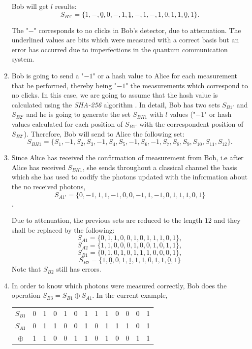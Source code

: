 \begin{enumerate}
      Bob will get $l$ results:
      $$S_{B2'} = \{1,-,\underline{0},0,-,1,\underline{1},-,1,-,1,0,1,1,\underline{0},1 \}.$$

      The "$-$"\space{ } corresponds to no clicks in Bob's detector, due to attenuation. The underlined values are bits which were measured with a correct basis but an error has occurred due to imperfections in the quantum communication system.

  \item Bob is going to send a "$-1$"\space{ } or a hash value to Alice for each measurement that he performed, thereby being "$-1$"\space{ } the measurements which correspond to no clicks. In this case, we are going to assume that the hash value is calculated using the \textit{SHA-256} algorithm \cite{Liu2009}. In detail, Bob has two sets $S_{B1'}$ and $S_{B2'}$ and he is going to generate the set $S_{BH1}$ with $l$ values ("$-1$"\space{ } or hash values calculated for each position of $S_{B1'}$ with the correspondent position of $S_{B2'}$). Therefore, Bob will send to Alice the following set:
      $$S_{BH1}=\{{S}_{1},-1,{S}_{2},{S}_{3}, -1,{S}_{4},{S}_{5},-1,{S}_{6},-1,{S}_{7},{S}_{8},{S}_{9},{S}_{10},{S}_{11},{S}_{12} \}.$$


  \item Since Alice has received the confirmation of measurement from Bob, i.e after Alice has received $S_{BH1}$, she sends throughout a classical channel the basis which she has used to codify the photons updated with the information about the no received photons, $$S_{A1'} = \{0,-1,1,1,-1,0,0,-1,1,-1,0,1,1,1,0,1 \}$$.

      Due to attenuation, the previous sets are reduced to the length $12$ and they shall be replaced by the following:
      $$S_{A1}=\{0,1,1,0,0,1,0,1,1,1,0,1 \},$$
      $$S_{A2}=\{1,1,0,0,0,1,0,0,1,0,1,1 \},$$
      $$S_{B1}=\{0,1,0,1,0,1,1,1,0,0,0,1 \},$$
      $$S_{B2}=\{1,\underline{0},0,1,\underline{1},1,1,0,1,1,\underline{0},1 \}$$
      Note that $S_{B2}$ still has errors.

  \item In order to know which photons were measured correctly, Bob does the operation $S_{B3}=S_{B1} \oplus S_{A1}$.
      In the current example,

  \begin{table}[H]
    \centering
    \begin{tabular}{c|c c c c c c c c c c c c }
     $S_{B1}$ & 0 & 1 & 0 & 1 & 0 & 1 & 1 & 1 & 0 & 0 & 0 & 1\\
     $S_{A1}$ & 0 & 1 & 1 & 0 & 0 & 1 & 0 & 1 & 1 & 1 & 0 & 1\\ \hline
     $\oplus$ & 1 & 1 & 0 & 0 & 1 & 1 & 0 & 1 & 0 & 0 & 1 & 1
    \end{tabular}
    \end{table}


\end{enumerate}
